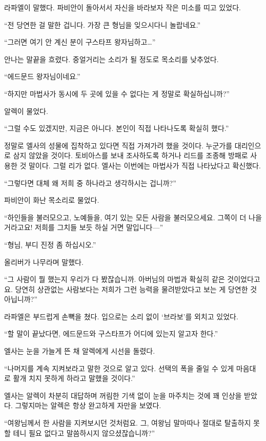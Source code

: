 라파엘이 말했다. 파비안이 돌아서서 자신을 바라보자 작은 미소를 띠고 있었다.

``전 당연한 걸 말한 겁니다. 가장 큰 형님을 잊으시다니 놀랍네요.''

``그러면 여기 안 계신 분이 구스타프 왕자님하고\ldots''

안나는 말끝을 흐렸다. 중얼거리는 소리가 될 정도로 목소리를 낮추었다.

``에드문드 왕자님이네요.''

``하지만 마법사가 동시에 두 곳에 있을 수 없다는 게 정말로 확실하십니까?''

알렉이 물었다.

``그럴 수도 있겠지만, 지금은 아니다. 본인이 직접 나타나도록 확실히 했다.''

정말로 엘사의 성물에 집착하고 있다면 직접 가져가려 했을 것이다. 누군가를 대리인으로 삼지 않았을 것이다. 토비아스를 보내 조사하도록 하거나 리드를 조종해 방패로 사용한 것 말이다. 그럴 리가 없다. 엘사는 이번에는 마법사가 직접 나타났다고 확신했다.

``그렇다면 대체 왜 저희 중 하나라고 생각하시는 겁니까?''

파비안이 화난 목소리로 물었다.

``하인들을 불러모으고, 노예들을, 여기 있는 모든 사람을 불러모으세요. 그쪽이 더 나을 거라고요! 저희를 그치들 보듯 하실 거면 말입니다—''

``형님, 부디 진정 좀 하십시오.''

올리버가 나무라며 말했다.

``그 사람이 뭘 했는지 우리가 다 봤잖습니까. 아버님의 마법과 확실히 같은 것이었다고요. 당연히 상관없는 사람보다는 저희가 그런 능력을 물려받았다고 보는 게 당연한 것 아닙니까?''

라파엘은 부드럽게 손뼉을 쳤다. 입으로는 소리 없이 `브라보'를 외치고 있었다.

``할 말이 끝났다면, 에드문드와 구스타프가 어디에 있는지 알고자 한다.''

엘사는 눈을 가늘게 뜬 채 알렉에게 시선을 돌렸다.

``나머지를 계속 지켜보라고 말한 것으로 알고 있다. 선택의 폭을 줄일 수 있게 마음대로 활개 치지 못하게 하라고 말했을 것이다.''

엘사는 알렉이 차분히 대답하며 꺼림한 기색 없이 눈을 마주치는 것에 꽤 인상을 받았다. 그렇지마는 알렉은 항상 완고하게 자만을 보였다.

``여왕님께서 한 사람을 지켜보시던 것처럼요. 그, 여왕님 말마따나 절대로 탈출하지 못할 테니 필요 없다고 말씀하시지 않으셨잖습니까?''


